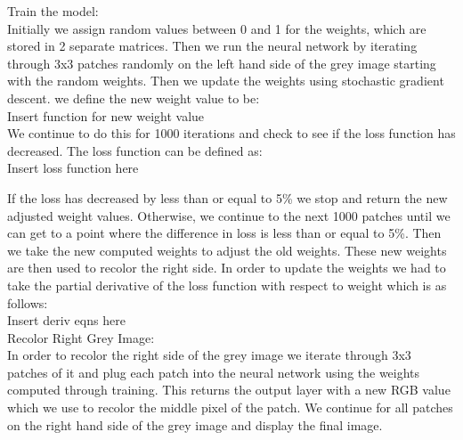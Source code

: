 \documentclass{article}
\theoremstyle{definition}
\begin{document}
        Train the model: \\
        Initially we assign random values between 0 and 1 for the weights, which are stored in 2 separate matrices. Then we run the neural network by iterating through 3x3 patches randomly on the left hand side of the grey image starting with the random weights. Then we update the weights using stochastic gradient descent. we define the new weight value to be: \\
        
        Insert function for new weight value \\
        
        We continue to do this for 1000 iterations and check to see if the loss function has decreased. The loss function can be defined as:\\
        
        Insert loss function here \\
        \begin{figure}[H]
            \centering
        \end{figure}
        
        If the loss has decreased by less than or equal to 5\% we stop and return the new adjusted weight values. Otherwise, we continue to the next 1000 patches until we can get to a point where the difference in loss is less than or equal to 5\%. Then we take the new computed weights to adjust the old weights. These new weights are then used to recolor the right side. In order to update the weights we had to take the partial derivative of the loss function with respect to weight which is as follows:\\
        
        Insert deriv eqns here\\
        
        Recolor Right Grey Image: \\
        In order to recolor the right side of the grey image we iterate through 3x3 patches of it and plug each patch into the neural network using the weights computed through training. This returns the output layer with a new RGB value which we use to recolor the middle pixel of the patch. We continue for all patches on the right hand side of the grey image and display the final image. \\
        
\end{document}
